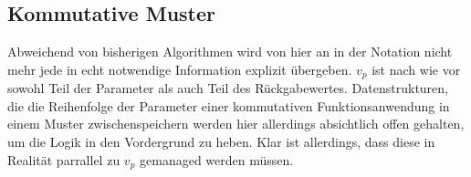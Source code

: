\subsection{Kommutative Muster} \label{subsecACMuster}


Abweichend von bisherigen Algorithmen wird von hier an in der Notation nicht mehr jede in echt notwendige Information explizit übergeben. $v_p$ ist nach wie vor sowohl Teil der Parameter als auch Teil des Rückgabewertes. Datenstrukturen, die die Reihenfolge der Parameter einer kommutativen Funktionsanwendung in einem Muster zwischenspeichern werden hier allerdings absichtlich offen gehalten, um die Logik in den Vordergrund zu heben. Klar ist allerdings, dass diese in Realität parrallel zu $v_p$ gemanaged werden müssen.
 
\begin{algorithm}
\DontPrintSemicolon
\caption{$\mathrm{FindCommutativeMatch} \colon M \times T \rightarrow \mathit{Bool}$}\label{FindCommutativeMatch}

 {
}
\end{algorithm}

